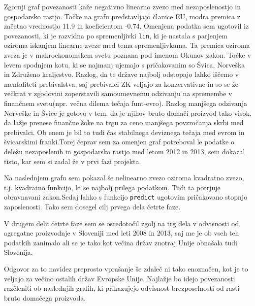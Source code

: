 \documentclass[11pt,a4paper]{article}
\begin{document}
Zgornji graf povezanosti kaže negativno linearno zvezo med nezaposlenostjo in gospodarsko rastjo. Točke na grafu predstavljajo članice EU, modra premica z začetno vrednostjo 11.9 in koeficientom -0.74. Omenjena podatka sem ugotovil iz povezanosti, ki je razvidna po spremenljivki \verb|lin|, ki je nastala s parjenjem oziroma iskanjem linearne zveze med tema spremenljivkama. Ta premica oziroma zveza je v makroekonomskem svetu poznana pod imenom Okunov zakon. Točke v levem spodnjem kotu, ki se najmanj ujemajo s pričakovanim so Švica, Norveška in Združeno kraljestvo. Razlog, da te države najbolj odstopajo lahko iščemo v mentaliteti prebivalstva, saj prebivalci ZK veljajo za konzervativne in so se že večkrat v zgodovini zoperstavili samoumevnemu odzivanju na spremembe v finančnem svetu(npr. večna dilema tečaja funt-evro). Razlog manjšega odzivanja Norveške in Švice je gotovo v tem, da je njihov bruto domači proizvod tako visok, da lažje prenese finančne šoke na trgu za ceno manjšega povzročanja skrbi med prebivalci. Ob enem je bil to tudi čas stabilnega deviznega tečaja med evrom in švicarskimi franki.Torej čeprav sem za omenjen graf potreboval le podatke o deležu nezaposlenih in gospodarsko rastjo med letom 2012 in 2013, sem dokazal tisto, kar sem si zadal že v prvi fazi projekta.

Na naslednjem grafu sem pokazal še nelinearno zvezo oziroma kvadratno zvezo, t.j. kvadratno funkcijo, ki se najbolj prilega podatkom. Tudi ta potrjuje obravnavani zakon.Sedaj lahko s funkcijo \verb|predict| ugotovim pričakovano stopnjo zaposlenosti. Tako sem dosegel cilj prvega dela četrte faze.


\pagebreak
V drugem delu četrte faze sem se osredotočil zgolj na trg dela v odvisnosti od agregatne proizvodnje v Sloveniji med leti 2008 in 2013, saj me je ob vseh teh podatkih zanimalo ali se je tako kot večina držav znotraj Unije obnašala tudi Slovenija. 

Odgovor za to navidez preprosto vprašanje še zdaleč ni tako enoznačen, kot je to veljajo za večino ostalih držav Evropske Unije. Najlažje bo idejo povezanosti razčleniti ob naslednjih grafih, ki prikazujejo odvisnost brezposelnosti od rasti bruto domačega proizvoda.
\end{document}
